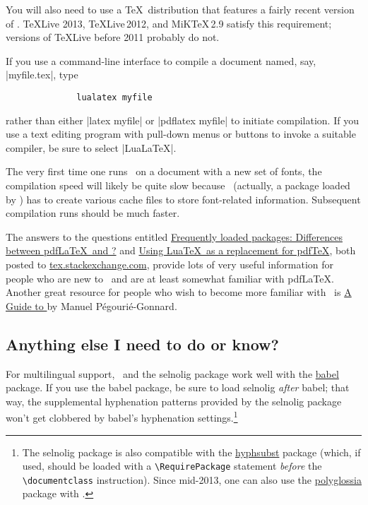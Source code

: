 \documentclass[11pt]{article}
\newcommand{\pkg}[1]{\textsf{#1}}
\begin{document}
You will also need to use a \TeX\ distribution that features a fairly recent version of \LuaLaTeX. \TeX Live 2013, \TeX Live\,2012, and MiK\TeX\,2.9 satisfy this requirement; versions of \TeX Live before 2011 probably do not.

If you use a command-line interface to compile a document named, say, |myfile.tex|, type 
\begin{Verbatim}
              lualatex myfile
\end{Verbatim}
rather than either |latex myfile| or |pdflatex myfile| to initiate compilation. If you use a text editing program with pull-down menus or buttons to invoke a suitable compiler, be sure to select |LuaLaTeX|. 

The very first time one runs \LuaLaTeX\ on a document with a new set of fonts, the compilation speed will likely be quite slow because \LuaLaTeX\ (actually, a package loaded by \LuaLaTeX) has to create various cache files to store font-related information. Subsequent compilation runs should be much faster. 

The answers to the questions entitled \href{http://tex.stackexchange.com/q/28642/5001}{Frequently loaded packages: Differences between pdf\LaTeX\ and \LuaLaTeX?} and \href{http://tex.stackexchange.com/q/32295/5001}{Using Lua\TeX\ as a replacement for pdf\TeX}, both posted to \href{http://tex.stackexchange.com/}{tex.stackexchange.com}, provide lots of very useful information for people who are new to \LuaLaTeX\ and are at least somewhat familiar with pdf\LaTeX. Another great resource for people who wish to become more familiar with \LuaLaTeX\ is  \href{http://mirror.ctan.org/info/luatex/lualatex-doc/lualatex-doc.pdf}{A Guide to \LuaLaTeX} by Manuel Pégourié-Gonnard.




\subsection{Anything else I need to do or know?} \label{sec:anythingelse}

For multilingual support, \LuaLaTeX\ and the \pkg{selnolig} package work well with the \href{http://www.ctan.org/pkg/babel}{\pkg{babel}} package. If you use the \pkg{babel} package, be sure to load \pkg{selnolig} \emph{after} \pkg{babel}; that way, the supplemental hyphenation patterns provided by the \pkg{selnolig} package won't get clobbered by \pkg{babel}'s hyphenation settings.\footnote{The \pkg{selnolig} package is also compatible with the \href{http://www.ctan.org/pkg/hyphsubst}{\pkg{hyphsubst}} package (which, if used, should be loaded with a \Verb+\RequirePackage+ statement \emph{before} the \Verb+\documentclass+ instruction). Since mid-2013, one can also use the \href{http://www.ctan.org/tex-archive/macros/latex/contrib/polyglossia}{\pkg{polyglossia}} package with \LuaLaTeX.}
\end{document}
